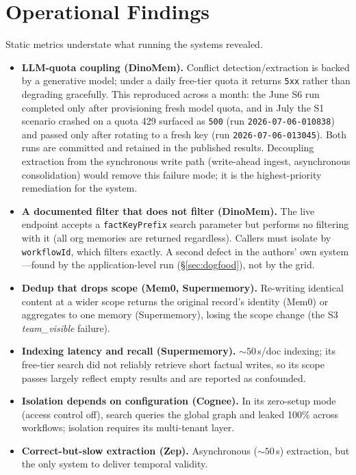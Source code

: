 \documentclass[11pt]{article}
\begin{document}
\section{Operational Findings}\label{sec:operational}
Static metrics understate what running the systems revealed.
\begin{itemize}
  \item \textbf{LLM-quota coupling (DinoMem).} Conflict detection/extraction is
  backed by a generative model; under a daily free-tier quota it returns \texttt{5xx}
  rather than degrading gracefully. This reproduced across a month: the June S6 run
  completed only after provisioning fresh model quota, and in July the S1 scenario
  crashed on a quota 429 surfaced as \texttt{500} (run \texttt{2026-07-06-010838})
  and passed only after rotating to a fresh key (run \texttt{2026-07-06-013045}).
  Both runs are committed and retained in the published results. Decoupling
  extraction from the synchronous write path (write-ahead ingest, asynchronous
  consolidation) would remove this failure mode; it is the highest-priority
  remediation for the system.
  \item \textbf{A documented filter that does not filter (DinoMem).} The live
  endpoint accepts a \texttt{factKeyPrefix} search parameter but performs no
  filtering with it (all org memories are returned regardless). Callers must isolate
  by \texttt{workflowId}, which filters exactly. A second defect in the authors' own
  system---found by the application-level run (\S\ref{sec:dogfood}), not by the grid.
  \item \textbf{Dedup that drops scope (Mem0, Supermemory).} Re-writing identical
  content at a wider scope returns the original record's identity (Mem0) or aggregates
  to one memory (Supermemory), losing the scope change (the S3 \emph{team\_visible}
  failure).
  \item \textbf{Indexing latency and recall (Supermemory).} ${\sim}50$\,s/doc indexing;
  its free-tier search did not reliably retrieve short factual writes, so its scope
  passes largely reflect empty results and are reported as confounded.
  \item \textbf{Isolation depends on configuration (Cognee).} In its zero-setup mode
  (access control off), search queries the global graph and leaked 100\% across
  workflows; isolation requires its multi-tenant layer.
  \item \textbf{Correct-but-slow extraction (Zep).} Asynchronous (${\sim}50$\,s)
  extraction, but the only system to deliver temporal validity.
\end{itemize}
\end{document}
